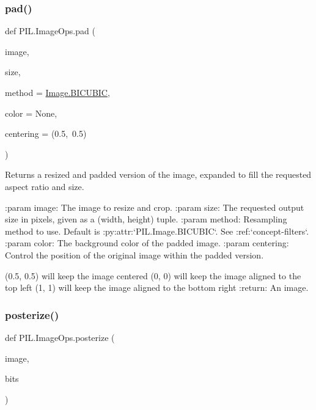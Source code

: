 \subsubsection{\texorpdfstring{pad()}{pad()}}
{\footnotesize\ttfamily def P\+I\+L.\+Image\+Ops.\+pad (\begin{DoxyParamCaption}\item[{}]{image,  }\item[{}]{size,  }\item[{}]{method = {\ttfamily \hyperlink{namespacePIL_1_1Image_a3824ac5a0532aa60f7072af889d88e59}{Image.\+B\+I\+C\+U\+B\+IC}},  }\item[{}]{color = {\ttfamily None},  }\item[{}]{centering = {\ttfamily (0.5,~0.5)} }\end{DoxyParamCaption})}

\begin{DoxyVerb}Returns a resized and padded version of the image, expanded to fill the
requested aspect ratio and size.

:param image: The image to resize and crop.
:param size: The requested output size in pixels, given as a
             (width, height) tuple.
:param method: Resampling method to use. Default is
               :py:attr:`PIL.Image.BICUBIC`. See :ref:`concept-filters`.
:param color: The background color of the padded image.
:param centering: Control the position of the original image within the
                  padded version.

                      (0.5, 0.5) will keep the image centered
                      (0, 0) will keep the image aligned to the top left
                      (1, 1) will keep the image aligned to the bottom
                      right
:return: An image.
\end{DoxyVerb}
 \mbox{\label{namespacePIL_1_1ImageOps_a5941e84a0d076c99b105bdc8039df8b5}} 
\subsubsection{\texorpdfstring{posterize()}{posterize()}}
{\footnotesize\ttfamily def P\+I\+L.\+Image\+Ops.\+posterize (\begin{DoxyParamCaption}\item[{}]{image,  }\item[{}]{bits }\end{DoxyParamCaption})}

